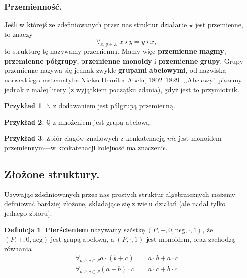 \documentclass{article}
\theoremstyle{definition}
\newtheorem{definition}{Definicja}[section]
\newtheorem{example}{Przykład}[section]
\begin{document}
\subsubsection{Przemienność.}
Jeśli w którejś ze zdefiniowanych przez nas struktur działanie $\star$ jest przemienne, to znaczy
\begin{equation}
	\forall_{x,y \in A}\; x \star y = y \star x,
\end{equation}
to strukturę tę nazywamy przemienną.
Mamy więc \textbf{przemienne magmy}, \textbf{przemienne półgrupy}, \textbf{przemienne monoidy} i \textbf{przemienne grupy}.
Grupy przemienne nazywa się jednak zwykle \textbf{grupami abelowymi},
od nazwiska norweskiego matematyka Nielsa Henrika Abela, 1802--1829.
,,Abelowy'' piszemy jednak z małej litery (z wyjątkiem początku zdania), gdyż jest to przymiotnik.

\begin{example}
	$\mathbb{N}$ z dodawaniem jest półgrupą przemienną.
\end{example}

\begin{example}
	$\mathbb{Q}$ z mnożeniem jest grupą abelową.
\end{example}

\begin{example}
	Zbiór ciągów znakowych z konkatenacją \textit{nie} jest monoidem przemiennym---w konkatenacji kolejność ma znaczenie.
\end{example}

\subsection{Złożone struktury.}
Używając zdefiniowanych przez nas prostych struktur algebraicznych możemy definiować bardziej złożone,
	składające się z wielu działań (ale nadal tylko jednego zbioru).

\begin{definition}
	\textbf{Pierścieniem} nazywamy szóstkę $(P, +, 0, \mathrm{neg}, \cdot, 1)$,
		że $(P, +, 0, \mathrm{neg})$ jest grupą abelową,
		a $(P, \cdot, 1)$ jest monoidem,
		oraz zachodzą równania
		\begin{align}
			\label{dist1}\forall_{a, b, c \in P} a \cdot (b + c) &= a \cdot b + a \cdot c \\
			\label{dist2}\forall_{a, b, c \in P} (a + b) \cdot c &= a \cdot c + b \cdot c
		\end{align}
\end{definition}
\end{document}
